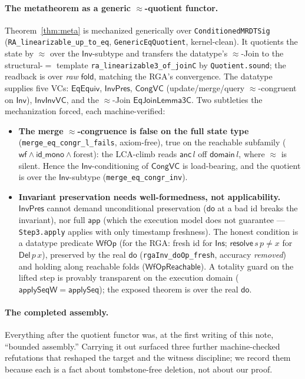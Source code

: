 \documentclass[11pt]{article}
\newcommand{\lean}[1]{\texttt{#1}}
\newcommand{\dodo}{\mathsf{do}}
\newcommand{\resolve}{\mathsf{resolve}}
\newcommand{\anc}{\mathsf{anc}}
\newcommand{\eqobs}{\approx}
\newcommand{\fold}{\mathsf{fold}}
\newcommand{\Inv}{\mathsf{Inv}}
\newcommand{\app}{\mathsf{app}}
\begin{document}
\paragraph{The metatheorem as a generic $\eqobs$-quotient functor.} Theorem~\ref{thm:meta} is
mechanized generically over \lean{ConditionedMRDTSig} (\lean{RA\_linearizable\_up\_to\_eq},
\lean{GenericEqQuotient}, kernel-clean). It quotients the state by $\eqobs$ over the $\Inv$-subtype
and transfers the datatype's $\eqobs$-Join to the structural-$=$ template
\lean{ra\_linearizable3\_of\_joinC} by \lean{Quotient.sound}; the readback is over \emph{raw}
$\fold$, matching the RGA's convergence. The datatype supplies five VCs: $\mathsf{EqEquiv}$,
$\mathsf{InvPres}$, $\mathsf{CongVC}$ (update/merge/query $\eqobs$-congruent on $\Inv$),
$\mathsf{InvInvVC}$, and the $\eqobs$-Join $\mathsf{EqJoinLemma3C}$. Two subtleties the
mechanization forced, each machine-verified:
\begin{itemize}[nosep]
  \item \textbf{The merge $\eqobs$-congruence is false on the full state type}
  (\lean{merge\_eq\_congr\_l\_fails}, axiom-free), true on the reachable subfamily
  ($\mathsf{wf}\wedge\mathsf{id\_mono}\wedge\text{forest}$): the LCA-climb reads $\anc\,l$ off
  $\mathsf{domain}\,l$, where $\eqobs$ is silent. Hence the $\Inv$-conditioning of $\mathsf{CongVC}$
  is load-bearing, and the quotient is over the $\Inv$-subtype (\lean{merge\_eq\_congr\_inv}).
  \item \textbf{Invariant preservation needs well-formedness, not applicability.} $\mathsf{InvPres}$
  cannot demand unconditional preservation ($\dodo$ at a bad id breaks the invariant), nor full
  $\app$ (which the execution model does not guarantee --- \lean{Step3.apply} applies with only
  timestamp freshness). The honest condition is a datatype predicate $\mathsf{WfOp}$ (for the RGA:
  fresh id for $\mathsf{Ins}$; $\resolve\,s\,p \neq x$ for $\mathsf{Del}\,p\,x$), preserved by the
  real $\dodo$ (\lean{rgaInv\_doOp\_fresh}, accuracy \emph{removed}) and holding along reachable
  folds ($\mathsf{WfOpReachable}$). A totality guard on the lifted step is provably transparent on
  the execution domain ($\mathsf{applySeqW}=\mathsf{applySeq}$); the exposed theorem is over the
  real $\dodo$.
\end{itemize}

\paragraph{The completed assembly.} Everything after the quotient functor was, at the
first writing of this note, ``bounded assembly.'' Carrying it out surfaced three further
machine-checked refutations that reshaped the target and the witness discipline; we record
them because each is a fact about tombstone-free deletion, not about our proof.
\end{document}
